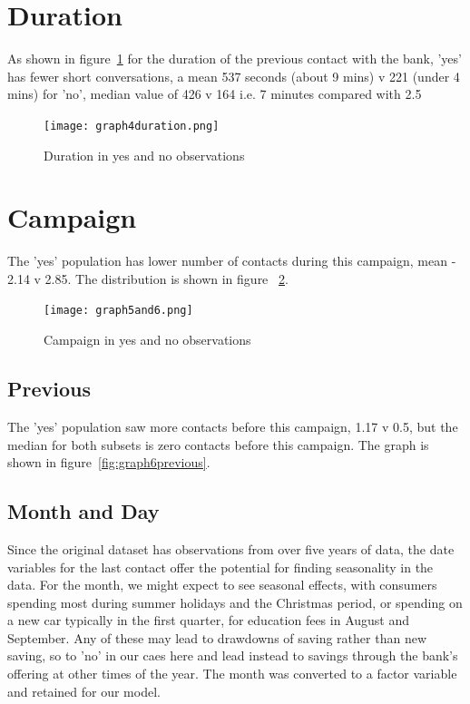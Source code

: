 \documentclass[9pt,technote]{IEEEtran}
\begin{document}
\section{Duration}

As shown in figure~\ref{fig:graph4duration} for the duration of the previous contact with the bank, 'yes' has fewer short conversations, a mean 537 seconds (about 9 mins) v 221 (under 4 mins) for 'no', median value of 426 v 164 i.e. 7 minutes compared with 2.5

\begin{figure}[htbp]
\centerline{\texttt{[image: graph4duration.png]}}
\caption{Duration in yes and no observations}
\label{fig:graph4duration}
\end{figure}

\section{Campaign}

The 'yes' population has lower number of contacts during this campaign, mean - 2.14 v 2.85.  The distribution is shown in figure ~\ref{fig:graph5campaign}.

\begin{figure}[htbp]
\centerline{\texttt{[image: graph5and6.png]}}
\caption{Campaign in yes and no observations}
\label{fig:graph5campaign}
\end{figure}

\subsection{Previous}

The 'yes' population saw more contacts before this campaign, 1.17 v 0.5, but the median for both subsets is zero contacts before this campaign.  The graph is shown in figure~\ref{fig:graph6previous}.  


\subsection{Month and Day}

Since the original dataset has observations from over five years of data, the date variables for the last contact offer the potential for finding seasonality in the data.  For the month, we might expect to see seasonal effects, with consumers spending most during summer holidays and the Christmas period, or spending on a new car typically in the first quarter, for education fees in August and September.  Any of these may lead to drawdowns of saving rather than new saving, so to 'no' in our caes here and lead instead to savings through the bank's offering at other times of the year.  The month was converted to a factor variable and retained for our model.  
\end{document}
